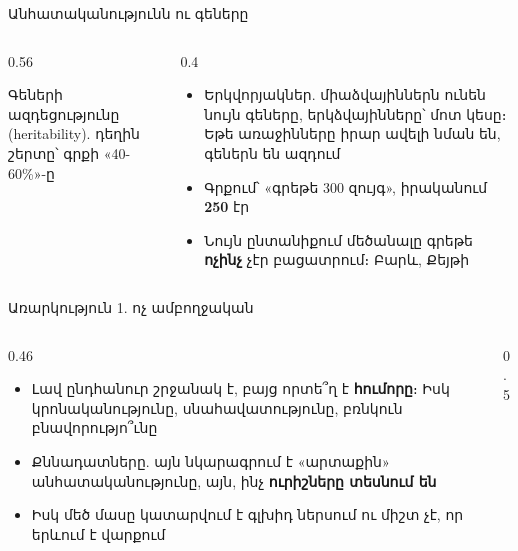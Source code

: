 \begin{frame}{Անհատականությունն ու գեները}
  \begin{columns}[c]
    \begin{column}{0.56\textwidth}
      \centering
      \par
      {\scriptsize Գեների ազդեցությունը (heritability). դեղին շերտը՝ գրքի «40-60\%»-ը}
    \end{column}
    \begin{column}{0.4\textwidth}
      \begin{itemize}
        \item Երկվորյակներ. միաձվայիններն ունեն նույն գեները, երկձվայինները՝ մոտ կեսը։ Եթե առաջինները իրար ավելի նման են, գեներն են ազդում
        \item<2-> Գրքում՝ «գրեթե 300 զույգ», իրականում \textbf{250} էր
        \item<3-> Նույն ընտանիքում մեծանալը գրեթե \textbf{ոչինչ} չէր բացատրում։ Բարև, Քեյթի 
      \end{itemize}
    \end{column}
  \end{columns}
\end{frame}

\begin{frame}
\end{frame}

\begin{frame}{Առարկություն 1. ոչ ամբողջական}
  \begin{columns}[c]
    \begin{column}{0.46\textwidth}
      \begin{itemize}
        \item Լավ ընդհանուր շրջանակ է, բայց որտե՞ղ է \textbf{հումորը}։ Իսկ կրոնականությունը, սնահավատությունը, բռնկուն բնավորությո՞ւնը
        \item<2-> Քննադատները. այն նկարագրում է «արտաքին» անհատականությունը, այն, ինչ \textbf{ուրիշները տեսնում են}
        \item<2-> Իսկ մեծ մասը կատարվում է գլխիդ ներսում ու միշտ չէ, որ երևում է վարքում
      \end{itemize}
    \end{column}
    \begin{column}{0.5\textwidth}
      \centering
      \scalebox{0.9}{}
    \end{column}
  \end{columns}
\end{frame}

